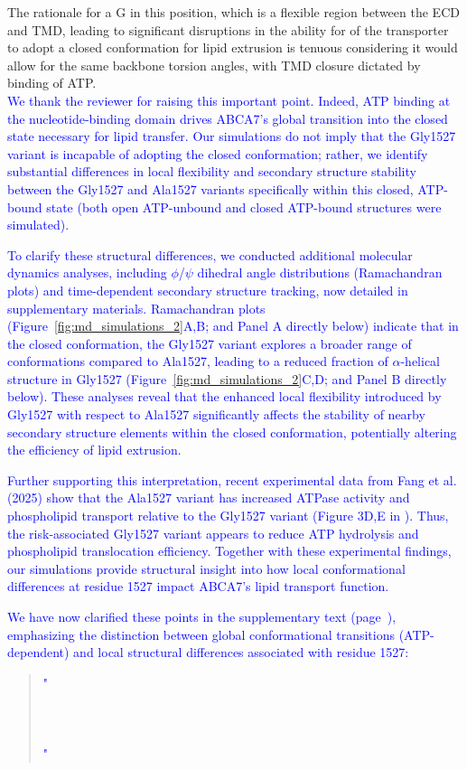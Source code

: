 The rationale for a G in this position, which is a flexible region between the ECD and TMD, leading to significant disruptions in the ability for of the transporter to adopt a closed conformation for lipid extrusion is tenuous considering it would allow for the same backbone torsion angles, with TMD closure dictated by binding of ATP.\\
\textcolor{blue}{We thank the reviewer for raising this important point. Indeed, ATP binding at the nucleotide-binding domain drives ABCA7’s global transition into the closed state necessary for lipid transfer. Our simulations do not imply that the Gly1527 variant is incapable of adopting the closed conformation; rather, we identify substantial differences in local flexibility and secondary structure stability between the Gly1527 and Ala1527 variants specifically within this closed, ATP-bound state (both open ATP-unbound and closed ATP-bound structures were simulated).} 

\textcolor{blue}{To clarify these structural differences, we conducted additional molecular dynamics analyses, including $\phi$/$\psi$ dihedral angle distributions (Ramachandran plots) and time-dependent secondary structure tracking, now detailed in supplementary materials. Ramachandran plots (Figure~\ref{fig:md_simulations_2}A,B; and Panel A directly below) indicate that in the closed conformation, the Gly1527 variant explores a broader range of conformations compared to Ala1527, leading to a reduced fraction of $\alpha$-helical structure in Gly1527  (Figure~\ref{fig:md_simulations_2}C,D; and Panel B directly below). These analyses reveal that the enhanced local flexibility introduced by Gly1527 with respect to Ala1527 significantly affects the stability of nearby secondary structure elements within the closed conformation, potentially altering the efficiency of lipid extrusion.}

\textcolor{blue}{Further supporting this interpretation, recent experimental data from Fang et al. (2025) \cite{Fang2025} show that the Ala1527 variant has increased ATPase activity and phospholipid transport relative to the Gly1527 variant (Figure 3D,E in \cite{Fang2025}). Thus, the risk-associated Gly1527 variant appears to reduce ATP hydrolysis and phospholipid translocation efficiency. Together with these experimental findings, our simulations provide structural insight into how local conformational differences at residue 1527 impact ABCA7’s lipid transport function.}

\textcolor{blue}{We have now clarified these points in the supplementary text (page~\pageref{quoteM-label}), emphasizing the distinction between global conformational transitions (ATP-dependent) and local structural differences associated with residue 1527:}
\begin{quote}
	\textcolor{blue}{"}\quoteM\\\\
    \quoteN\\\\
    \quoteO\textcolor{blue}{"}
\end{quote}

